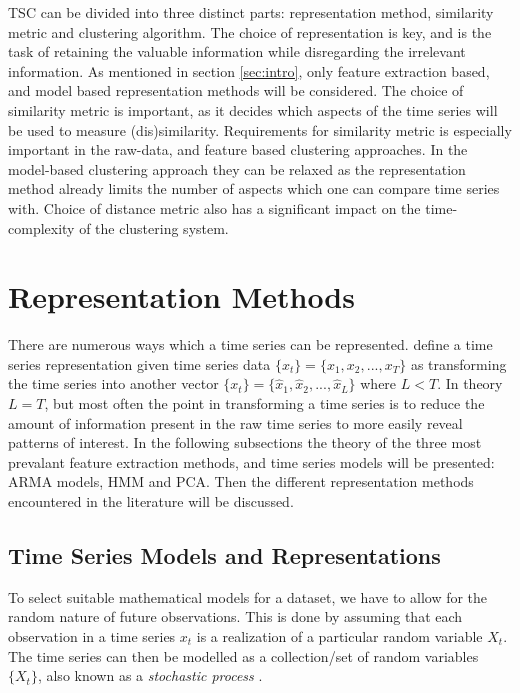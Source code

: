 TSC can be divided into three distinct parts: representation method, similarity metric and clustering algorithm. 
The choice of representation is key, and is the task of retaining the valuable information while disregarding the irrelevant information. As mentioned in section \ref{sec:intro}, only feature extraction based, and model based representation methods will be considered. 
The choice of similarity metric is important, as it decides which aspects of the time series will be used to measure (dis)similarity. 
Requirements for similarity metric is especially important in the raw-data, and feature based clustering approaches. 
In the model-based clustering approach they can be relaxed as the representation method already limits the number of aspects which one can compare time series with. 
Choice of distance metric also has a significant impact on the time-complexity of the clustering system. 


\section{Representation Methods}
There are numerous ways which a time series can be represented. 
\textcite{tsc_rev} define a time series representation given time series data $\{x_t\} = \{x_1, x_2, ... ,x_T\}$ as transforming the time series into another vector $\{x_t\} = \{\hat{x}_1, \hat{x}_2, ... ,\hat{x}_L\}$ where $L < T$. 
In theory $L=T$, but most often the point in transforming a time series is to reduce the amount of information present in the raw time series to more easily reveal patterns of interest. 
% 
In the following subsections the theory of the three most prevalant feature extraction methods, and time series models will be presented: ARMA models, HMM and PCA.
Then the different representation methods encountered in the literature will be discussed.

\subsection{Time Series Models and Representations} \label{sec:ts_models}
To select suitable mathematical models for a dataset, we have to allow for the random nature of future observations. 
This is done by assuming that each observation in a time series $x_t$ is a realization of a particular random variable $X_t$. 
The time series can then be modelled as a collection/set of random variables $\{X_t\}$, also known as a \textit{stochastic process} \cite{brockwell_davis_advanced}. 

